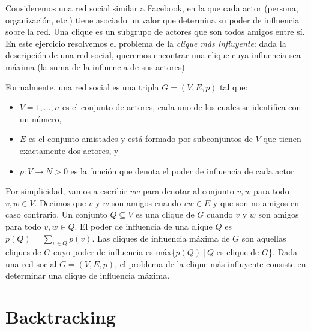 \documentclass[10pt, a4paper]{article}
\begin{document}
Consideremos una red social similar a Facebook, en la que cada actor (persona, organización, etc.) tiene asociado un valor que determina su poder de influencia sobre la red. Una clique es un subgrupo de actores que son todos amigos entre sí. En este ejercicio resolvemos el problema de la \emph{clique más influyente}: dada la descripción de una red social, queremos encontrar una clique cuya influencia sea máxima (la suma de la influencia de sus actores).

Formalmente, una red social es una tripla $G = (V, E, p)$ tal que:

\begin{itemize}
\item $V = {1,...,n}$ es el conjunto de actores, cada uno de los cuales se identifica con un número,
\item $E$ es el conjunto amistades y está formado por subconjuntos de $V$ que tienen exactamente dos actores, y
\item $p : V \rightarrow N > 0$ es la función que denota el poder de influencia de cada actor.
\end{itemize}

Por simplicidad, vamos a escribir $vw$ para denotar al conjunto ${v, w}$ para todo $v, w \in V$. Decimos que $v$ y $w$ son amigos cuando $vw \in E$ y que son no-amigos en caso contrario. Un conjunto $Q \subseteq V$ es una clique de $G$ cuando $v$ y $w$ son amigos para todo $v, w \in Q$. El poder de influencia de una clique $Q$ es $p(Q) = \sum_{v\in Q}p(v)$. Las cliques de influencia máxima de $G$ son aquellas cliques de $G$ cuyo poder de influencia es máx\{$p(Q) \ | \ Q$ es clique de $G$\}. Dada una red social $G = (V, E, p)$, el problema de la clique más influyente consiste en determinar una clique de influencia máxima.

\section{Backtracking}
\end{document}
